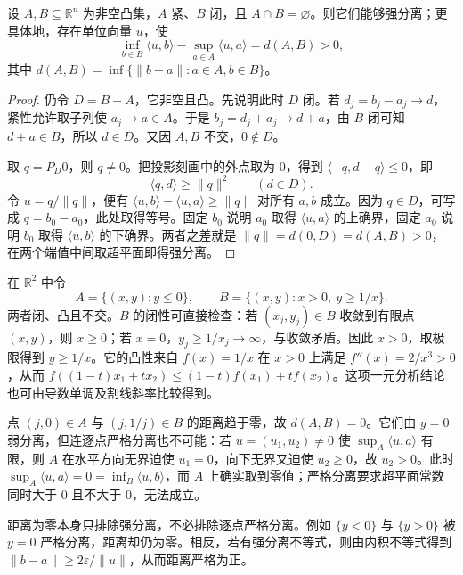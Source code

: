 \begin{theorem}\label{g1:thm:compact-closed-separation}
	设 \(A,B\subseteq\mathbb R^n\) 为非空凸集，\(A\) 紧、\(B\) 闭，且 \(A\cap B=\varnothing\)。则它们能够强分离；更具体地，存在单位向量 \(u\)，使
	\[
		\inf_{b\in B}\langle u,b\rangle-\sup_{a\in A}\langle u,a\rangle
		=d(A,B)>0,
	\]
	其中 \(d(A,B)=\inf\{\lVert b-a\rVert:a\in A,b\in B\}\)。
\end{theorem}
\begin{proof}
	仍令 \(D=B-A\)，它非空且凸。先说明此时 \(D\) 闭。若 \(d_j=b_j-a_j\to d\)，紧性允许取子列使 \(a_j\to a\in A\)。于是 \(b_j=d_j+a_j\to d+a\)，由 \(B\) 闭可知 \(d+a\in B\)，所以 \(d\in D\)。又因 \(A,B\) 不交，\(0\notin D\)。

	取 \(q=P_D0\)，则 \(q\ne0\)。把投影刻画中的外点取为 \(0\)，得到 \(\langle -q,d-q\rangle\leq0\)，即
	\[
		\langle q,d\rangle\geq\lVert q\rVert^2\qquad(d\in D).
	\]
	令 \(u=q/\lVert q\rVert\)，便有 \(\langle u,b\rangle-\langle u,a\rangle\geq\lVert q\rVert\) 对所有 \(a,b\) 成立。因为 \(q\in D\)，可写成 \(q=b_0-a_0\)，此处取得等号。固定 \(b_0\) 说明 \(a_0\) 取得 \(\langle u,a\rangle\) 的上确界，固定 \(a_0\) 说明 \(b_0\) 取得 \(\langle u,b\rangle\) 的下确界。两者之差就是 \(\lVert q\rVert=d(0,D)=d(A,B)>0\)，在两个端值中间取超平面即得强分离。
\end{proof}

\begin{example}\label{g1:exm:zero-distance-separation}
	在 \(\mathbb R^2\) 中令
	\[
		A=\{(x,y):y\leq0\},\qquad
		B=\{(x,y):x>0,\ y\geq1/x\}.
	\]
	两者闭、凸且不交。\(B\) 的闭性可直接检查：若 \((x_j,y_j)\in B\) 收敛到有限点 \((x,y)\)，则 \(x\geq0\)；若 \(x=0\)，\(y_j\geq1/x_j\to\infty\)，与收敛矛盾。因此 \(x>0\)，取极限得到 \(y\geq1/x\)。它的凸性来自 \(f(x)=1/x\) 在 \(x>0\) 上满足 \(f''(x)=2/x^3>0\)，从而 \(f((1-t)x_1+tx_2)\leq(1-t)f(x_1)+tf(x_2)\)。这项一元分析结论也可由导数单调及割线斜率比较得到。

	点 \((j,0)\in A\) 与 \((j,1/j)\in B\) 的距离趋于零，故 \(d(A,B)=0\)。它们由 \(y=0\) 弱分离，但连逐点严格分离也不可能：若 \(u=(u_1,u_2)\ne0\) 使 \(\sup_A\langle u,a\rangle\) 有限，则 \(A\) 在水平方向无界迫使 \(u_1=0\)，向下无界又迫使 \(u_2\geq0\)，故 \(u_2>0\)。此时 \(\sup_A\langle u,a\rangle=0=\inf_B\langle u,b\rangle\)，而 \(A\) 上确实取到零值；严格分离要求超平面常数同时大于 \(0\) 且不大于 \(0\)，无法成立。
\end{example}

距离为零本身只排除强分离，不必排除逐点严格分离。例如 \(\{y<0\}\) 与 \(\{y>0\}\) 被 \(y=0\) 严格分离，距离却仍为零。相反，若有强分离不等式，则由内积不等式得到 \(\lVert b-a\rVert\geq2\varepsilon/\lVert u\rVert\)，从而距离严格为正。

